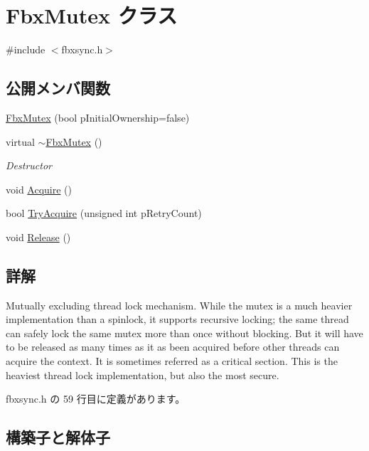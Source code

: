 \hypertarget{class_fbx_mutex}{}\section{Fbx\+Mutex クラス}
\label{class_fbx_mutex}


{\ttfamily \#include $<$fbxsync.\+h$>$}

\subsection*{公開メンバ関数}
\begin{DoxyCompactItemize}
\item 
\hyperlink{class_fbx_mutex_af2e9cbb51bc45952ccb6a310717e70a1}{Fbx\+Mutex} (bool p\+Initial\+Ownership=false)
\item 
virtual \hyperlink{class_fbx_mutex_a68eda93d02e2adc9f717d28208305aa6}{$\sim$\+Fbx\+Mutex} ()
\begin{DoxyCompactList}\small\item\em Destructor \end{DoxyCompactList}\item 
void \hyperlink{class_fbx_mutex_abca054ea52a16ade66050af56a04b97c}{Acquire} ()
\item 
bool \hyperlink{class_fbx_mutex_ace271bd592e917dffdc850b74482d52f}{Try\+Acquire} (unsigned int p\+Retry\+Count)
\item 
void \hyperlink{class_fbx_mutex_af64f050aba0c86a19c75c8fc236325d1}{Release} ()
\end{DoxyCompactItemize}


\subsection{詳解}
Mutually excluding thread lock mechanism. While the mutex is a much heavier implementation than a spinlock, it supports recursive locking; the same thread can safely lock the same mutex more than once without blocking. But it will have to be released as many times as it as been acquired before other threads can acquire the context. It is sometimes referred as a critical section. This is the heaviest thread lock implementation, but also the most secure. 

 fbxsync.\+h の 59 行目に定義があります。



\subsection{構築子と解体子}
\mbox{\label{class_fbx_mutex_af2e9cbb51bc45952ccb6a310717e70a1}} 
